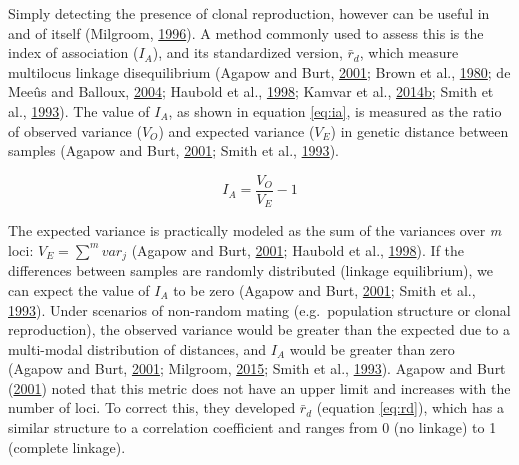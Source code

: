 \documentclass[double,12pt]{beavtex}
\begin{document}
  Simply detecting the presence of clonal reproduction, however can be
  useful in and of itself (Milgroom,
  \protect\hyperlink{ref-milgroom1996recombination}{1996}). A method
  commonly used to assess this is the index of association (\(I_A\)), and
  its standardized version, \(\bar{r}_d\), which measure multilocus
  linkage disequilibrium (Agapow and Burt,
  \protect\hyperlink{ref-Agapow_2001}{2001}; Brown et al.,
  \protect\hyperlink{ref-brown1980multilocus}{1980}; de Meeûs and Balloux,
  \protect\hyperlink{ref-de2004clonal}{2004}; Haubold et al.,
  \protect\hyperlink{ref-haubold1998detecting}{1998}; Kamvar et al.,
  \protect\hyperlink{ref-kamvar2014poppr}{2014}\protect\hyperlink{ref-kamvar2014poppr}{b};
  Smith et al., \protect\hyperlink{ref-smith1993how}{1993}). The value of
  \(I_A\), as shown in equation \eqref{eq:ia}, is measured as the ratio of
  observed variance (\(V_O\)) and expected variance (\(V_E\)) in genetic
  distance between samples (Agapow and Burt,
  \protect\hyperlink{ref-Agapow_2001}{2001}; Smith et al.,
  \protect\hyperlink{ref-smith1993how}{1993}).
  
  \begin{equation}
  I_A = \frac{V_O}{V_E} - 1 \label{eq:ia}
  \end{equation}
  
  The expected variance is practically modeled as the sum of the variances
  over \emph{m} loci: \(V_E = \sum^m{var_j}\) (Agapow and Burt,
  \protect\hyperlink{ref-Agapow_2001}{2001}; Haubold et al.,
  \protect\hyperlink{ref-haubold1998detecting}{1998}). If the differences
  between samples are randomly distributed (linkage equilibrium), we can
  expect the value of \(I_A\) to be zero (Agapow and Burt,
  \protect\hyperlink{ref-Agapow_2001}{2001}; Smith et al.,
  \protect\hyperlink{ref-smith1993how}{1993}). Under scenarios of
  non-random mating (e.g.~population structure or clonal reproduction),
  the observed variance would be greater than the expected due to a
  multi-modal distribution of distances, and \(I_A\) would be greater than
  zero (Agapow and Burt, \protect\hyperlink{ref-Agapow_2001}{2001};
  Milgroom, \protect\hyperlink{ref-milgroom2015population}{2015}; Smith et
  al., \protect\hyperlink{ref-smith1993how}{1993}). Agapow and Burt
  (\protect\hyperlink{ref-Agapow_2001}{2001}) noted that this metric does
  not have an upper limit and increases with the number of loci. To
  correct this, they developed \(\bar{r}_d\) (equation \eqref{eq:rd}), which
  has a similar structure to a correlation coefficient and ranges from 0
  (no linkage) to 1 (complete linkage).
  
\end{document}

